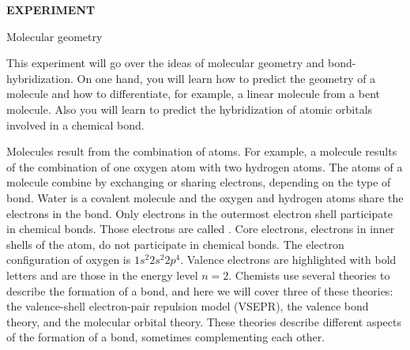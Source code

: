 \documentclass[main.tex]{subfiles}
\begin{document}
\pagestyle{empty}


\hfill
\vspace{0.2cm}
\begin{center}
{\large \bfseries 
EXPERIMENT 
\par
\Huge
Molecular geometry
\\[5pt] \par}
\vspace{0.2cm}
\end{center}
\par

\vspace{0.2cm}{\large \bfseries Goal}
This experiment will go over the ideas of molecular geometry and bond-hybridization. On one hand, you will learn how to predict the geometry of a molecule and how to differentiate, for example, a linear molecule from a bent molecule. Also you will learn to predict the hybridization of atomic orbitals involved in a chemical bond.


\vspace{0.2cm}{\large \bfseries Background}
Molecules result from the combination of atoms. For example, a  molecule results of the combination of one oxygen atom with two hydrogen atoms. The atoms of a molecule combine by exchanging or sharing electrons, depending on the type of bond. Water is a covalent molecule and the oxygen and hydrogen atoms share the electrons in the bond. Only electrons in the outermost electron shell participate in chemical bonds. Those electrons are called . Core electrons, electrons in inner shells of the atom, do not participate in chemical bonds. The electron configuration of oxygen is $1s^2$\textbf{$2s^2 2p^4$}. Valence electrons are highlighted with bold letters and are those in the energy level $n=2$. Chemists use several theories to describe the formation of a bond, and here we will cover three of these theories: the valence-shell electron-pair repulsion model (VSEPR), the valence bond theory, and the molecular orbital theory. These theories describe different aspects of the formation of a bond, sometimes complementing each other.
\end{document}
